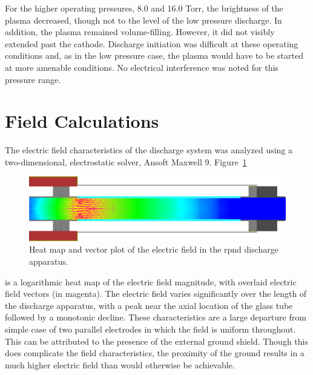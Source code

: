 For the higher operating pressures, 8.0 and 16.0 Torr, the brightness of the
plasma decreased, though not to the level of the low pressure discharge. In
addition, the plasma remained volume-filling. However, it did not visibly
extended past the cathode. Discharge initiation was difficult at these operating
conditions and, as in the low pressure case, the plasma would have to be started
at more amenable conditions. No electrical interference was noted for this
pressure range.

\section{Field Calculations}

The electric field characteristics of the discharge system was analyzed using a
two-dimensional, electrostatic solver, Ansoft Maxwell 9. Figure~\ref{fig:fields}
\begin{figure}
  \centering
  \includegraphics{./chapters/experiment/figures/fields.jpg}
  \caption{Heat map and vector plot of the electric field in the \acs{rpnd}
  discharge apparatus.}
  \label{fig:fields}
\end{figure}
is a logarithmic heat map of the electric field magnitude, with overlaid
electric field vectors (in magenta). The electric field varies significantly
over the length of the discharge apparatus, with a peak near the axial location
of the glass tube followed by a monotonic decline. These characteristics are
a large departure from simple case of two parallel electrodes in which the field
is uniform throughout. This can be attributed to the presence of the external
ground shield. Though this does complicate the field characteristics, the
proximity of the ground results in a much higher electric field than would
otherwise be achievable. 

